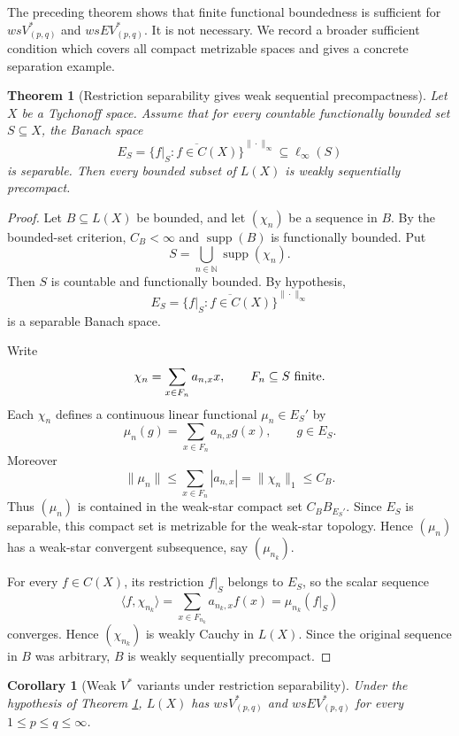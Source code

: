 \documentclass[11pt]{article}
\newtheorem{theorem}{Theorem}
\newtheorem{corollary}{Corollary}
\newcommand{\N}{\mathbb N}
\newcommand{\supp}{\operatorname{supp}}
\newcommand{\Vstar}{V^\ast}
\newcommand{\EVstar}{EV^\ast}
\begin{document}
The preceding theorem shows that finite functional boundedness is
sufficient for \(ws\Vstar_{(p,q)}\) and \(ws\EVstar_{(p,q)}\). It is not
necessary. We record a broader sufficient condition which covers all
compact metrizable spaces and gives a concrete separation example.

\begin{theorem}[Restriction separability gives weak sequential precompactness]
\label{thm:restriction-separable}
Let \(X\) be a Tychonoff space. Assume that for every countable
functionally bounded set \(S\subseteq X\), the Banach space
\[
  E_S=\overline{\{f|_S:f\in C(X)\}}^{\|\cdot\|_\infty}
  \subseteq \ell_\infty(S)
\]
is separable. Then every bounded subset of \(L(X)\) is weakly
sequentially precompact.
\end{theorem}

\begin{proof}
Let \(B\subseteq L(X)\) be bounded, and let \((\chi_n)\) be a sequence in
\(B\). By the bounded-set criterion, \(C_B<\infty\) and \(\supp(B)\) is
functionally bounded. Put
\[
  S=\bigcup_{n\in\N}\supp(\chi_n).
\]
Then \(S\) is countable and functionally bounded. By hypothesis,
\[
  E_S=\overline{\{f|_S:f\in C(X)\}}^{\|\cdot\|_\infty}
\]
is a separable Banach space.

Write
\[
  \chi_n=\sum_{x\in F_n}a_{n,x}x,\qquad F_n\subseteq S\ \hbox{finite}.
\]
Each \(\chi_n\) defines a continuous linear functional \(\mu_n\in E_S'\)
by
\[
  \mu_n(g)=\sum_{x\in F_n}a_{n,x}g(x),\qquad g\in E_S.
\]
Moreover
\[
  \|\mu_n\|\le \sum_{x\in F_n}|a_{n,x}|=\|\chi_n\|_1\le C_B.
\]
Thus \((\mu_n)\) is contained in the weak-star compact set
\(C_BB_{E_S'}\). Since \(E_S\) is separable, this compact set is
metrizable for the weak-star topology. Hence \((\mu_n)\) has a weak-star
convergent subsequence, say \((\mu_{n_k})\).

For every \(f\in C(X)\), its restriction \(f|_S\) belongs to \(E_S\), so
the scalar sequence
\[
  \langle f,\chi_{n_k}\rangle
  =
  \sum_{x\in F_{n_k}}a_{n_k,x}f(x)
  =
  \mu_{n_k}(f|_S)
\]
converges. Hence \((\chi_{n_k})\) is weakly Cauchy in \(L(X)\). Since the
original sequence in \(B\) was arbitrary, \(B\) is weakly sequentially
precompact.
\end{proof}

\begin{corollary}[Weak \(V^\ast\) variants under restriction separability]
\label{cor:wsvstar}
Under the hypothesis of Theorem \ref{thm:restriction-separable},
\(L(X)\) has \(ws\Vstar_{(p,q)}\) and \(ws\EVstar_{(p,q)}\) for every
\(1\le p\le q\le\infty\).
\end{corollary}
\end{document}
